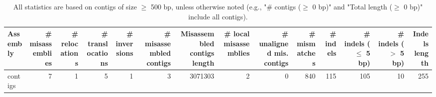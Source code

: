 \documentclass[12pt,a4paper]{article}
\begin{document}
\begin{table}[ht]
\begin{center}
\caption{All statistics are based on contigs of size $\geq$ 500 bp, unless otherwise noted (e.g., "\# contigs ($\geq$ 0 bp)" and "Total length ($\geq$ 0 bp)" include all contigs).}
\begin{tabular}{|l*{13}{|r}|}
\hline
Assembly & \# misassemblies &     \# relocations &     \# translocations &     \# inversions & \# misassembled contigs & Misassembled contigs length & \# local misassemblies & \# unaligned mis. contigs & \# mismatches & \# indels &     \# indels ($\leq$ 5 bp) &     \# indels ($>$ 5 bp) & Indels length \\ \hline
contigs & 7 & 1 & 5 & 1 & 3 & 3071303 & 2 & 0 & 840 & 115 & 105 & 10 & 255 \\ \hline
\end{tabular}
\end{center}
\end{table}
\end{document}
